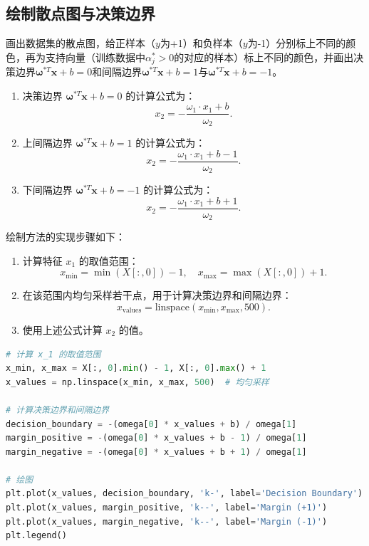 \documentclass[12pt,a4paper,oneside]{article}
\begin{document}
\subsection{绘制散点图与决策边界}
\qquad 画出数据集的散点图，给正样本（$y$为+1）和负样本（$y$为-1）分别标上不同的颜色，再为支持向量（训练数据中$\alpha_j^* > 0$的对应的样本）标上不同的颜色，并画出决策边界$\pmb{\omega}^{*T}\pmb{x}+b=0$和间隔边界$\pmb{\omega}^{*T}\pmb{x}+b=1$与$\pmb{\omega}^{*T}\pmb{x}+b=-1$。

\begin{enumerate}
    \item 决策边界 $\pmb{\omega}^{*T}\pmb{x} + b = 0$ 的计算公式为：
    \[
    x_2 = -\frac{\omega_1 \cdot x_1 + b}{\omega_2}.
    \]
    \item 上间隔边界 $\pmb{\omega}^{*T}\pmb{x} + b = 1$ 的计算公式为：
    \[
    x_2 = -\frac{\omega_1 \cdot x_1 + b - 1}{\omega_2}.
    \]
    \item 下间隔边界 $\pmb{\omega}^{*T}\pmb{x} + b = -1$ 的计算公式为：
    \[
    x_2 = -\frac{\omega_1 \cdot x_1 + b + 1}{\omega_2}.
    \]
\end{enumerate}

绘制方法的实现步骤如下：
\begin{enumerate}
    \item 计算特征 $x_1$ 的取值范围：
    \[
    x_{\text{min}} = \min(X[:, 0]) - 1, \quad x_{\text{max}} = \max(X[:, 0]) + 1.
    \]
    \item 在该范围内均匀采样若干点，用于计算决策边界和间隔边界：
    \[
    x_{\text{values}} = \text{linspace}(x_{\text{min}}, x_{\text{max}}, 500).
    \]
    \item 使用上述公式计算 $x_2$ 的值。
\end{enumerate}


\begin{lstlisting}[language=Python, caption=计算并绘制决策边界和间隔边界]
# 计算 x_1 的取值范围
x_min, x_max = X[:, 0].min() - 1, X[:, 0].max() + 1
x_values = np.linspace(x_min, x_max, 500)  # 均匀采样

# 计算决策边界和间隔边界
decision_boundary = -(omega[0] * x_values + b) / omega[1]
margin_positive = -(omega[0] * x_values + b - 1) / omega[1]
margin_negative = -(omega[0] * x_values + b + 1) / omega[1]

# 绘图
plt.plot(x_values, decision_boundary, 'k-', label='Decision Boundary')
plt.plot(x_values, margin_positive, 'k--', label='Margin (+1)')
plt.plot(x_values, margin_negative, 'k--', label='Margin (-1)')
plt.legend()
\end{lstlisting}
\end{document}
